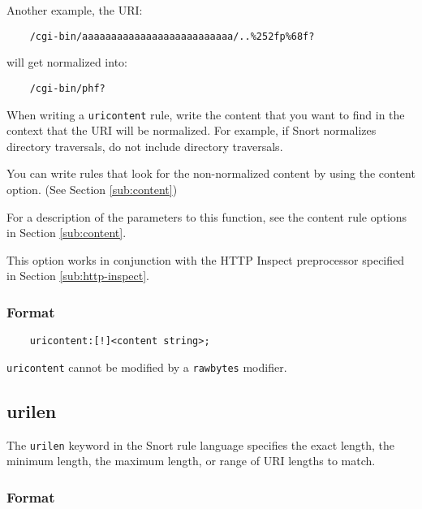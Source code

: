\documentclass[english]{report}
\newenvironment{note}{
\samepage
    \vspace{10pt}{\textsf{
        {\hspace{7pt}\Huge{$\triangle$\hspace{-12.5pt}{\Large{$^!$}}}}\hspace{5pt}
        {\Large{NOTE}}
    }
    }
   \begin{center}
    \par\vspace{-17pt}

    \begin{lrbox}{\savepar}
    \begin{minipage}[r]{6in}
}
{
    \end{minipage}
    \end{lrbox}
    \fbox{
        \usebox{
            \savepar
	}
    }
    \par\vskip10pt
    \end{center}
}
\newenvironment{note}{
        \begin{rawhtml}
        <p><table border="1"><tr><td><b>
        Note:&nbsp;&nbsp;</b>
        \end{rawhtml}
}{
        \begin{rawhtml}
        </b></td></tr></table></p>
        \end{rawhtml}
}
\begin{document}
Another example, the URI:

\begin{verbatim}
    /cgi-bin/aaaaaaaaaaaaaaaaaaaaaaaaaa/..%252fp%68f?
\end{verbatim}

will get normalized into:

\begin{verbatim}
    /cgi-bin/phf?
\end{verbatim}

When writing a \texttt{uricontent} rule, write the content that you want to
find in the context that the URI will be normalized.  For example, if Snort
normalizes directory traversals, do not include directory traversals.  

You can write rules that look for the non-normalized content by using the
content option.  (See Section \ref{sub:content})

For a description of the parameters to this function, see the content rule
options in Section \ref{sub:content}. 

This option works in conjunction with the HTTP Inspect preprocessor specified
in Section \ref{sub:http-inspect}.

\subsubsection{Format}

\begin{verbatim}
    uricontent:[!]<content string>;
\end{verbatim}

\begin{note}

\texttt{uricontent} cannot be modified by a \texttt{rawbytes} modifier.

\end{note}

\subsection{urilen}

The \texttt{urilen} keyword in the Snort rule language specifies the exact
length, the minimum length, the maximum length, or range of URI lengths to
match.  

\subsubsection{Format}
\end{document}
